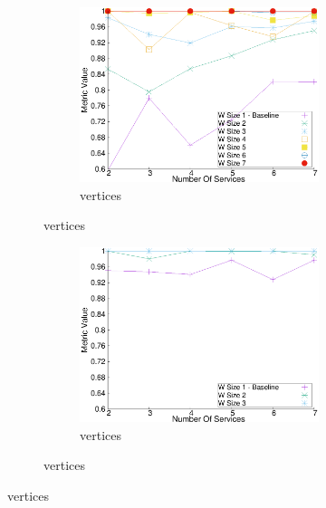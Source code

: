 \begin{figure}[H]
\begin{adjustbox}{minipage=\linewidth,scale=0.75}
\begin{subfigure}{0.45\textwidth}
    \begin{subfigure}{\textwidth}
      \includegraphics[width=\textwidth]{Images/graphs/window_quality_performance_diff_perce_n7_s7_20_100_n7}
      \caption{ vertices}
      \label{fig:quality_window_wide_perce_n7}
    \end{subfigure}
  \end{subfigure}
  \begin{subfigure}{0.45\textwidth}
    \begin{subfigure}{\textwidth}
      \includegraphics[width=\textwidth]{Images/graphs/window_quality_performance_diff_perce_n7_s7_50_89_n3}
      \caption{ vertices}

      \label{fig:quality_window_average_perce_n3}
    \end{subfigure}


\end{subfigure}
\end{adjustbox}
\end{figure}
